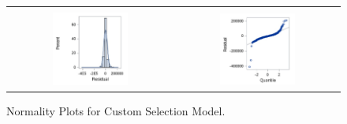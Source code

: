 \documentclass[11pt]{scrartcl} %
\begin{document}
\begin{figure}[H] %
	\centering
	\begin{tabular}{p{} p{}}
\hline	
	\multicolumn{1}{|c}{} &  \multicolumn{1}{c|}{} \\
		\multicolumn{1}{|c}{\includegraphics[width=0.48\textwidth]{../graphics/A2CustHist}} &
		\multicolumn{1}{c|}{\includegraphics[width=0.48\textwidth]{../graphics/A2Custqq}}\\
		\hline
	\end{tabular}		
	\caption{Normality Plots for Custom Selection Model.}
	\label{fig:A2CustomQQ}
\end{figure}
\end{document}
